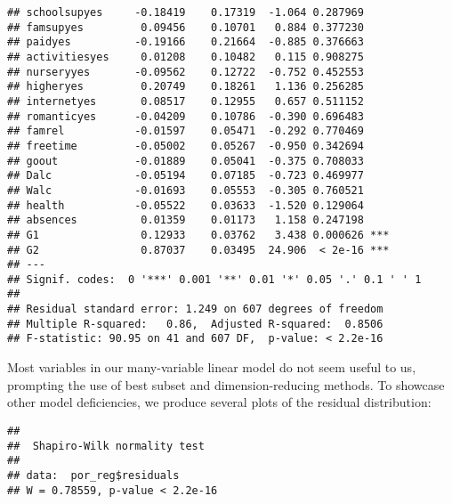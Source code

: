 \documentclass[
]{article}
\newenvironment{Shaded}{\begin{snugshade}}{\end{snugshade}}
\newcommand{\AttributeTok}[1]{\textcolor[rgb]{0.77,0.63,0.00}{#1}}
\newcommand{\DecValTok}[1]{\textcolor[rgb]{0.00,0.00,0.81}{#1}}
\newcommand{\FunctionTok}[1]{\textcolor[rgb]{0.00,0.00,0.00}{#1}}
\newcommand{\NormalTok}[1]{#1}
\newcommand{\SpecialCharTok}[1]{\textcolor[rgb]{0.00,0.00,0.00}{#1}}
\begin{document}
\begin{verbatim}
## schoolsupyes     -0.18419    0.17319  -1.064 0.287969    
## famsupyes         0.09456    0.10701   0.884 0.377230    
## paidyes          -0.19166    0.21664  -0.885 0.376663    
## activitiesyes     0.01208    0.10482   0.115 0.908275    
## nurseryyes       -0.09562    0.12722  -0.752 0.452553    
## higheryes         0.20749    0.18261   1.136 0.256285    
## internetyes       0.08517    0.12955   0.657 0.511152    
## romanticyes      -0.04209    0.10786  -0.390 0.696483    
## famrel           -0.01597    0.05471  -0.292 0.770469    
## freetime         -0.05002    0.05267  -0.950 0.342694    
## goout            -0.01889    0.05041  -0.375 0.708033    
## Dalc             -0.05194    0.07185  -0.723 0.469977    
## Walc             -0.01693    0.05553  -0.305 0.760521    
## health           -0.05522    0.03633  -1.520 0.129064    
## absences          0.01359    0.01173   1.158 0.247198    
## G1                0.12933    0.03762   3.438 0.000626 ***
## G2                0.87037    0.03495  24.906  < 2e-16 ***
## ---
## Signif. codes:  0 '***' 0.001 '**' 0.01 '*' 0.05 '.' 0.1 ' ' 1
## 
## Residual standard error: 1.249 on 607 degrees of freedom
## Multiple R-squared:   0.86,  Adjusted R-squared:  0.8506 
## F-statistic: 90.95 on 41 and 607 DF,  p-value: < 2.2e-16
\end{verbatim}

Most variables in our many-variable linear model do not seem useful to
us, prompting the use of best subset and dimension-reducing methods. To
showcase other model deficiencies, we produce several plots of the
residual distribution:

\begin{Shaded}
\end{Shaded}

\begin{verbatim}
## 
##  Shapiro-Wilk normality test
## 
## data:  por_reg$residuals
## W = 0.78559, p-value < 2.2e-16
\end{verbatim}
\end{document}
